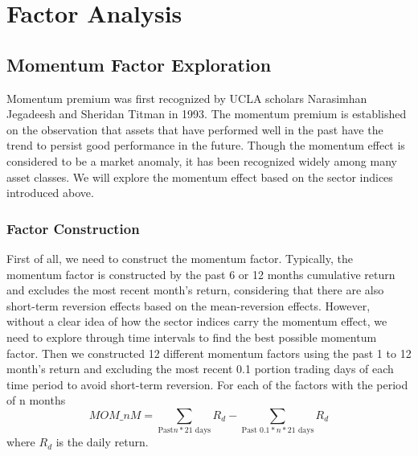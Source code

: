 \documentclass{article}
\begin{document}
\section{Factor Analysis}

\subsection{Momentum Factor Exploration}
Momentum premium was first recognized by UCLA scholars Narasimhan Jegadeesh and Sheridan Titman in 1993. The momentum premium is established on the observation that assets that have performed well in the past have the trend to persist good performance in the future. Though the momentum effect is considered to be a market anomaly, it has been recognized widely among many asset classes. We will explore the momentum effect based on the sector indices introduced above.

\subsubsection{Factor Construction}
First of all, we need to construct the momentum factor. Typically, the momentum factor is constructed by the past 6 or 12 months cumulative return and excludes the most recent month's return, considering that there are also short-term reversion effects based on the mean-reversion effects. However, without a clear idea of how the sector indices carry the momentum effect, we need to explore through time intervals to find the best possible momentum factor. Then we constructed 12 different momentum factors using the past 1 to 12 month's return and excluding the most recent 0.1 portion trading days of each time period to avoid short-term reversion. For each of the factors with the period of n months
\begin{equation*}
     MOM\_{nM} = \sum_{\text{Past} n*21 \text{ days}}  R_{d} - \sum_{\text{Past }  0.1*n*21 \text{ days}}   R_{d}
\end{equation*}
where $R_{d}$ is the daily return.
\end{document}
